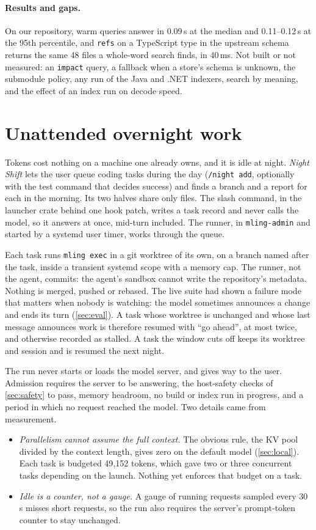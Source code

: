 \documentclass[11pt]{article}
\newcommand{\code}[1]{\texttt{#1}}
\begin{document}
\paragraph{Results and gaps.} On our repository, warm queries answer in 0.09\,s at the median and
0.11--0.12\,s at the 95th percentile, and \code{refs} on a TypeScript type in the upstream schema
returns the same 48 files a whole-word search finds, in 40\,ms. Not built or not measured: an
\code{impact} query, a fallback when a store's schema is unknown, the submodule policy, any run of
the Java and .NET indexers, search by meaning, and the effect of an index run on decode speed.

\section{Unattended overnight work}
\label{sec:night}

Tokens cost nothing on a machine one already owns, and it is idle at night. \emph{Night Shift}
lets the user queue coding tasks during the day (\code{/night add}, optionally with the test
command that decides success) and finds a branch and a report for each in the morning. Its two
halves share only files. The slash command, in the launcher crate behind one hook patch, writes a
task record and never calls the model, so it answers at once, mid-turn included. The runner, in
\code{mling-admin} and started by a systemd user timer, works through the queue.

Each task runs \code{mling exec} in a git worktree of its own, on a branch named after the task,
inside a transient systemd scope with a memory cap. The runner, not the agent, commits: the
agent's sandbox cannot write the repository's metadata. Nothing is merged, pushed or rebased. The
live suite had shown a failure mode that matters when nobody is watching: the model sometimes
announces a change and ends its turn (\cref{sec:eval}). A task whose worktree is unchanged and
whose last message announces work is therefore resumed with ``go ahead'', at most twice, and
otherwise recorded as stalled. A task the window cuts off keeps its worktree and session and is
resumed the next night.

The run never starts or loads the model server, and gives way to the user. Admission requires the
server to be answering, the host-safety checks of \cref{sec:safety} to pass, memory headroom, no
build or index run in progress, and a period in which no request reached the model. Two details
came from measurement.
\begin{itemize}
  \item \emph{Parallelism cannot assume the full context.} The obvious rule, the KV pool divided
    by the context length, gives zero on the default model (\cref{sec:local}). Each task is
    budgeted 49{,}152 tokens, which gave two or three concurrent tasks depending on the launch.
    Nothing yet enforces that budget on a task.
  \item \emph{Idle is a counter, not a gauge.} A gauge of running requests sampled every 30\,s
    misses short requests, so the run also requires the server's prompt-token counter to stay
    unchanged.
\end{itemize}
\end{document}

